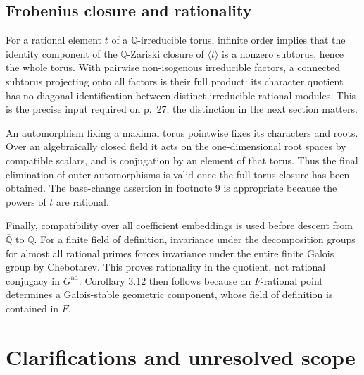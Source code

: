 \documentclass[10pt]{article}
\begin{document}
\subsection*{Frobenius closure and rationality}
For a rational element \(t\) of a \(\mathbb Q\)-irreducible torus, infinite order implies that the identity component of the \(\mathbb Q\)-Zariski closure of \(\langle t\rangle\) is a nonzero subtorus, hence the whole torus. With pairwise non-isogenous irreducible factors, a connected subtorus projecting onto all factors is their full product: its character quotient has no diagonal identification between distinct irreducible rational modules. This is the precise input required on p. 27; the distinction in the next section matters.\par
An automorphism fixing a maximal torus pointwise fixes its characters and roots. Over an algebraically closed field it acts on the one-dimensional root spaces by compatible scalars, and is conjugation by an element of that torus. Thus the final elimination of outer automorphisms is valid once the full-torus closure has been obtained. The base-change assertion in footnote 9 is appropriate because the powers of \(t\) are rational.\par
Finally, compatibility over all coefficient embeddings is used before descent from \(\overline{\mathbb Q}\) to \(\mathbb Q\). For a finite field of definition, invariance under the decomposition groups for almost all rational primes forces invariance under the entire finite Galois group by Chebotarev. This proves rationality in the quotient, not rational conjugacy in \(G^\mathrm{ad}\). Corollary 3.12 then follows because an \(F\)-rational point determines a Galois-stable geometric component, whose field of definition is contained in \(F\).\par
\section*{Clarifications and unresolved scope}
\end{document}
